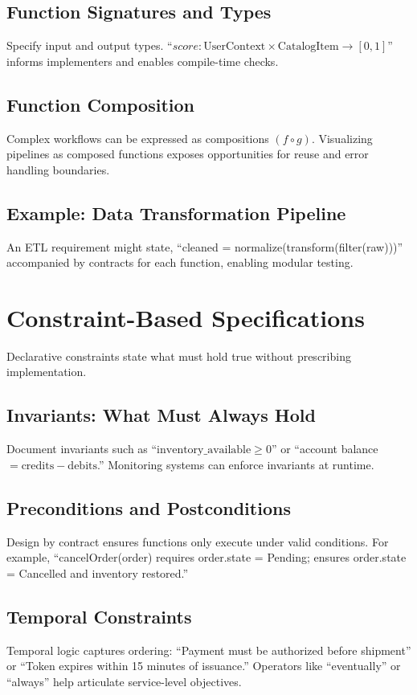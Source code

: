 \subsection{Function Signatures and Types}
Specify input and output types. ``$score: \text{UserContext} \times \text{CatalogItem} \rightarrow [0,1]$'' informs implementers and enables compile-time checks.

\subsection{Function Composition}
Complex workflows can be expressed as compositions $(f \circ g)$. Visualizing pipelines as composed functions exposes opportunities for reuse and error handling boundaries.

\subsection{Example: Data Transformation Pipeline}
An ETL requirement might state, ``cleaned = normalize(transform(filter(raw)))'' accompanied by contracts for each function, enabling modular testing.

\section{Constraint-Based Specifications}
\label{sec:constraints}

Declarative constraints state what must hold true without prescribing implementation.

\subsection{Invariants: What Must Always Hold}
Document invariants such as ``$\text{inventory\_available} \ge 0$'' or ``account balance $= \text{credits} - \text{debits}$.'' Monitoring systems can enforce invariants at runtime.

\subsection{Preconditions and Postconditions}
Design by contract ensures functions only execute under valid conditions. For example, ``cancelOrder(order) requires order.state = Pending; ensures order.state = Cancelled and inventory restored.''

\subsection{Temporal Constraints}
Temporal logic captures ordering: ``Payment must be authorized before shipment'' or ``Token expires within 15 minutes of issuance.'' Operators like ``eventually'' or ``always'' help articulate service-level objectives.

